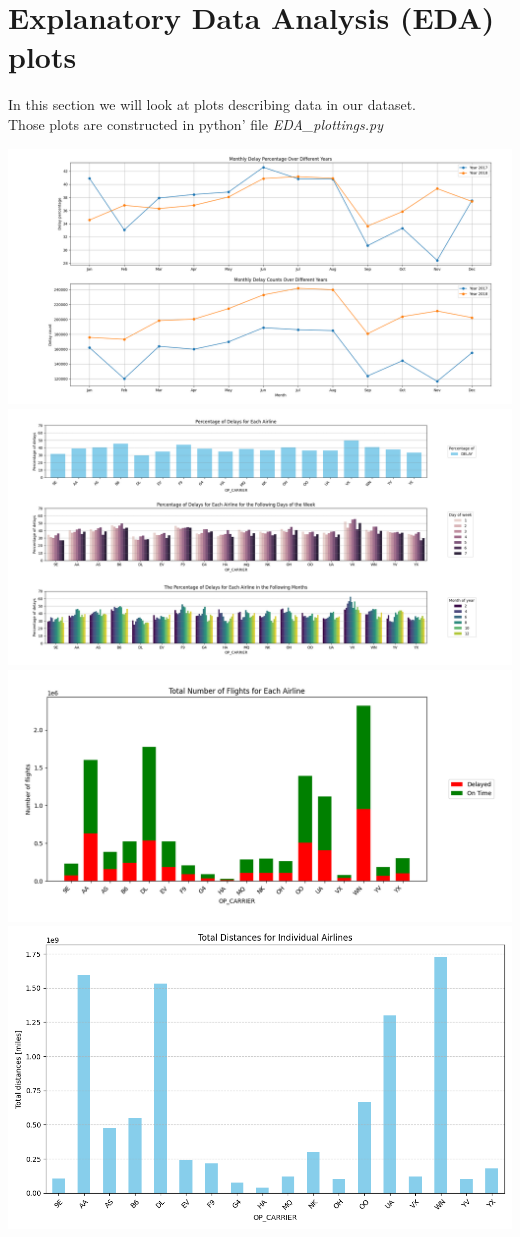 \documentclass{article}
\begin{document}
\section{Explanatory Data Analysis (EDA) plots}
In this section we will look at plots describing data in our dataset.\\
Those plots are constructed in python' file \textit{EDA\_plottings.py} 
	
	\includegraphics[scale=0.22]{plot1}
	\includegraphics[scale=0.25]{plot2}
	\includegraphics[scale=0.4]{plot3}
	\includegraphics[scale=0.4]{plot4}	
\end{document}
